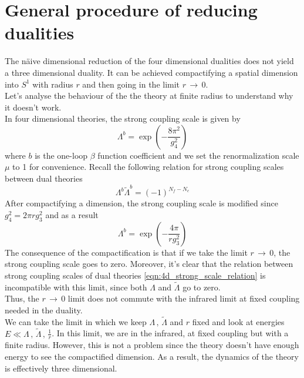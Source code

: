 \section{General procedure of reducing dualities}
The n{\"a}ive dimensional reduction of the four dimensional dualities does not yield a three dimensional duality.
It can be achieved compactifying a spatial dimension into $S^1$ with radius $r$ and then going in the limit $r \, \rightarrow \, 0$. \\
Let's analyse the behaviour of the the theory at finite radius to understand why it doesn't work.\\
In four dimensional theories, the strong coupling scale is given by
\begin{equation}
 \Lambda^{b} = \exp{ \left(  - \frac{8 \pi^2}{g_4^2}\right)}
 \end{equation} 
where $b$ is the one-loop $\beta$ function coefficient and we set the renormalization scale $\mu$ to 1 for convenience.
Recall the following relation for strong coupling scales between dual theories 
\begin{equation}
  \Lambda^{b}  \tilde{\Lambda}^{b} = (-1)^{N_f - N_c}
  \label{eqn:4d_strong_scale_relation}
\end{equation}
After compactifying a dimension, the strong coupling scale is modified \cite{Aharony:2013dha} since  $g_4^2 =  2 \pi r g_3^2$ and as a result
\begin{equation}
  \Lambda^{b} = \exp{ \left(  - \frac{4 \pi}{ r g_3^2}\right)}
\end{equation}
The consequence of the compactification is that if we take the limit $r \, \rightarrow \, 0$,
the strong coupling scale goes to zero.
Moreover, it's clear that the relation between strong coupling scales of dual theories \eqref{eqn:4d_strong_scale_relation} is incompatible with this limit, since both $\Lambda $ and $ \tilde{\Lambda} $ go to zero.\\
Thus, the $r \, \rightarrow \, 0$ limit does not commute with the infrared limit at fixed coupling needed in the duality.\\
We can take the limit in which we keep $\Lambda \, , \, \tilde{\Lambda}$ and $r$ fixed and look at energies $E \ll \Lambda \, , \, \tilde{\Lambda} \,, \, \frac{1}{r}$. 
In this limit, we are in the infrared, at fixed coupling but with a finite radius.
However, this is not a problem since the theory doesn't have enough energy to see the compactified dimension.
As a result, the dynamics of the theory is effectively three dimensional.\\
